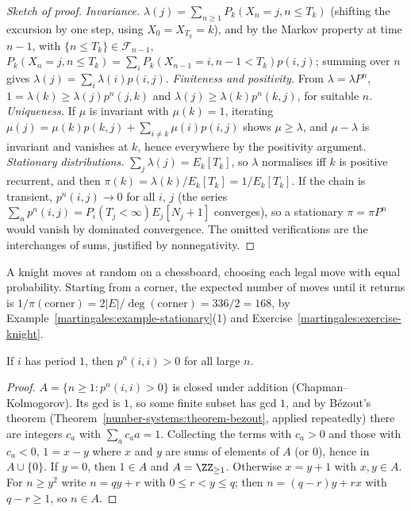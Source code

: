 \begin{proof}[Sketch of proof]
\emph{Invariance.} $\lambda(j) = \sum_{n \geq 1}P_k(X_n = j, n \leq T_k)$ (shifting the excursion by one step, using $X_0 = X_{T_k} = k$), and by the Markov property at time $n - 1$, with $\{n \leq T_k\} \in \mathcal{F}_{n-1}$,
$P_k(X_n = j, n \leq T_k) = \sum_iP_k(X_{n-1} = i, n - 1 < T_k)p(i, j)$; summing over $n$ gives $\lambda(j) = \sum_i\lambda(i)p(i, j)$. \emph{Finiteness and positivity.} From $\lambda = \lambda P^n$, $1 = \lambda(k) \geq \lambda(j)p^n(j, k)$ and
$\lambda(j) \geq \lambda(k)p^n(k, j)$, for suitable $n$. \emph{Uniqueness.} If $\mu$ is invariant with $\mu(k) = 1$, iterating $\mu(j) = \mu(k)p(k, j) + \sum_{i \neq k}\mu(i)p(i, j)$ shows $\mu \geq \lambda$, and $\mu - \lambda$ is invariant and
vanishes at $k$, hence everywhere by the positivity argument. \emph{Stationary distributions.} $\sum_j\lambda(j) = E_k[T_k]$, so $\lambda$ normalises iff $k$ is positive recurrent, and then $\pi(k) = \lambda(k)/E_k[T_k] = 1/E_k[T_k]$. If
the chain is transient, $p^n(i, j) \to 0$ for all $i$, $j$ (the series $\sum_np^n(i, j) = P_i(T_j < \infty)E_j[N_j + 1]$ converges), so a stationary $\pi = \pi P^n$ would vanish by dominated convergence. The omitted verifications are
the interchanges of sums, justified by nonnegativity.
\end{proof}

\begin{example}\label{martingales:example-knight}
A knight moves at random on a chessboard, choosing each legal move with equal probability. Starting from a corner, the expected number of moves until it returns is $1/\pi(\text{corner}) = 2|E|/\deg(\text{corner}) = 336/2 = 168$,
by Example~\ref{martingales:example-stationary}(1) and Exercise~\ref{martingales:exercise-knight}.
\end{example}

\begin{lemma}\label{martingales:lemma-aperiodic}
If $i$ has period $1$, then $p^n(i, i) > 0$ for all large $n$.
\end{lemma}

\begin{proof}
$A = \{n \geq 1 : p^n(i, i) > 0\}$ is closed under addition (Chapman--Kolmogorov). Its gcd is $1$, so some finite subset has gcd $1$, and by B\'ezout's theorem (Theorem~\ref{number-systems:theorem-bezout}, applied repeatedly) there are integers $c_a$ with
$\sum_ac_aa = 1$. Collecting the terms with $c_a > 0$ and those with $c_a < 0$, $1 = x - y$ where $x$ and $y$ are sums of elements of $A$ (or $0$), hence in $A \cup \{0\}$. If $y = 0$, then $1 \in A$ and $A = \ZZ_{\geq 1}$. Otherwise
$x = y + 1$ with $x, y \in A$. For $n \geq y^2$ write $n = qy + r$ with $0 \leq r < y \leq q$; then $n = (q - r)y + rx$ with $q - r \geq 1$, so $n \in A$.
\end{proof}

